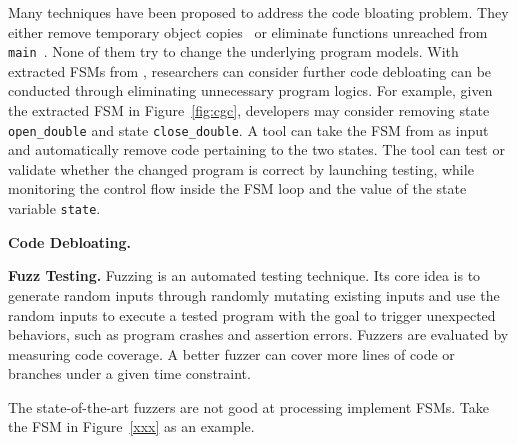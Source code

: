 Many techniques have been proposed to address the code bloating problem. 
They either remove temporary object copies~\cite{BloatFSE2008,XuBloatPLDI2009,
XuBloatPLDI2010,Reusable,Cachetor} 
or eliminate functions unreached from 
\texttt{main}~\cite{container-debloating-1, 
container-debloating-2, dinghao-1}. 
None of them try to change the underlying program models.
With extracted FSMs from \Tool{}, researchers can consider 
further code debloating can be conducted through
eliminating unnecessary program logics. 
For example, given the extracted FSM in Figure~\ref{fig:cgc}, 
developers may consider removing state \texttt{open\_double} and 
state \texttt{close\_double}. 
A tool can take the FSM from \Tool{} as input and automatically 
remove code pertaining to the two states. 
The tool can test or validate whether the changed program is correct 
by launching testing, while monitoring the control flow 
inside the FSM loop and the value of the state variable \texttt{state}.

\noindent\textbf{Code Debloating.}



\noindent\textbf{Fuzz Testing.}
Fuzzing is an automated testing technique. Its core idea is 
to generate random inputs through randomly mutating existing inputs and 
use the random inputs to execute 
a tested program with the goal to trigger unexpected behaviors,
such as program crashes and assertion errors.
Fuzzers are evaluated by measuring code coverage. 
A better fuzzer can cover more lines of code 
or branches under a given time constraint. 


The state-of-the-art fuzzers are not good at processing 
implement FSMs.
Take the FSM in Figure~\ref{xxx} as an example. 
